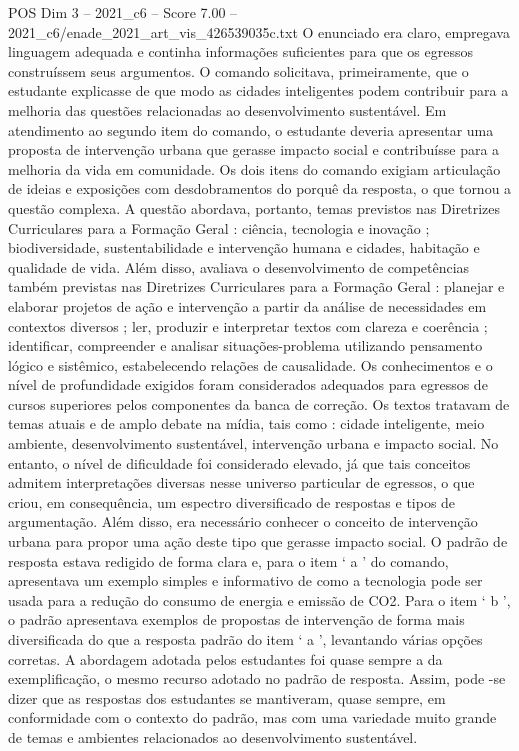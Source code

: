 \begin{textsample}{POS Dim 3 – 2021\_c6 – Score 7.00 – 2021\_c6/enade\_2021\_art\_vis\_426539035c.txt}
O enunciado era claro, empregava linguagem adequada e continha informações suficientes para que os egressos construíssem seus argumentos.
O comando solicitava, primeiramente, que o estudante explicasse de que modo as cidades inteligentes podem contribuir para a melhoria das questões relacionadas ao desenvolvimento sustentável.
Em atendimento ao segundo item do comando, o estudante deveria apresentar uma proposta de intervenção urbana que gerasse impacto social e contribuísse para a melhoria da vida em comunidade.
Os dois itens do comando exigiam articulação de ideias e exposições com desdobramentos do porquê da resposta, o que tornou a questão complexa.
A questão abordava, portanto, temas previstos nas Diretrizes Curriculares para a Formação Geral : ciência, tecnologia e inovação ; biodiversidade, sustentabilidade e intervenção humana e cidades, habitação e qualidade de vida.
Além disso, avaliava o desenvolvimento de competências também previstas nas Diretrizes Curriculares para a Formação Geral : planejar e elaborar projetos de ação e intervenção a partir da análise de necessidades em contextos diversos ; ler, produzir e interpretar textos com clareza e coerência ; identificar, compreender e analisar situações-problema utilizando pensamento lógico e sistêmico, estabelecendo relações de causalidade.
Os conhecimentos e o nível de profundidade exigidos foram considerados adequados para egressos de cursos superiores pelos componentes da banca de correção.
Os textos tratavam de temas atuais e de amplo debate na mídia, tais como : cidade inteligente, meio ambiente, desenvolvimento sustentável, intervenção urbana e impacto social.
No entanto, o nível de dificuldade foi considerado elevado, já que tais conceitos admitem interpretações diversas nesse universo particular de egressos, o que criou, em consequência, um espectro diversificado de respostas e tipos de argumentação.
Além disso, era necessário conhecer o conceito de intervenção urbana para propor uma ação deste tipo que gerasse impacto social.
O padrão de resposta estava redigido de forma clara e, para o item ‘ a ’ do comando, apresentava um exemplo simples e informativo de como a tecnologia pode ser usada para a redução do consumo de energia e emissão de CO2.
Para o item ‘ b ’, o padrão apresentava exemplos de propostas de intervenção de forma mais diversificada do que a resposta padrão do item ‘ a ’, levantando várias opções corretas.
A abordagem adotada pelos estudantes foi quase sempre a da exemplificação, o mesmo recurso adotado no padrão de resposta.
Assim, pode -se dizer que as respostas dos estudantes se mantiveram, quase sempre, em conformidade com o contexto do padrão, mas com uma variedade muito grande de temas e ambientes relacionados ao desenvolvimento sustentável.

\end{textsample}
